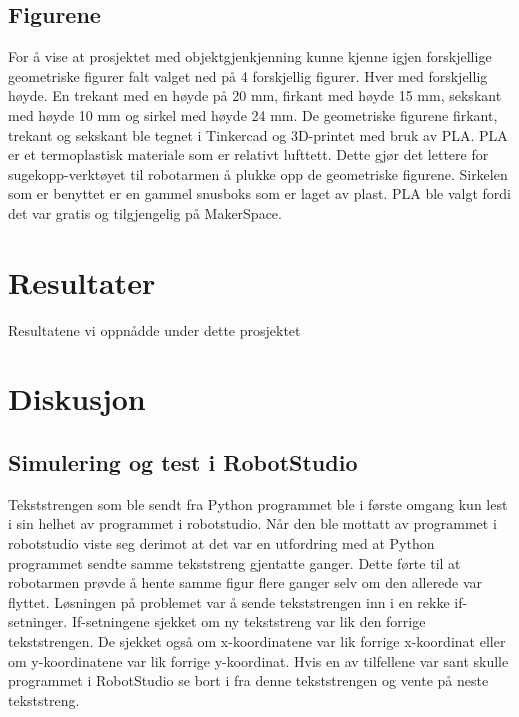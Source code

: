 \documentclass[conference]{IEEEtran}
\begin{document}
    \subsection{Figurene}
        For å vise at prosjektet med objektgjenkjenning kunne kjenne igjen forskjellige geometriske figurer falt valget ned på 4 forskjellig figurer. 
        Hver med forskjellig høyde. En trekant med en høyde på 20 mm, firkant med høyde 15 mm, sekskant med høyde 10 mm og sirkel med høyde 24 mm. 
        De geometriske figurene firkant, trekant og sekskant ble tegnet i Tinkercad \cite{metode:tinkercad} og 3D-printet med bruk av PLA. PLA er et termoplastisk materiale 
        som er relativt lufttett. Dette gjør det lettere for sugekopp-verktøyet til robotarmen å plukke opp de geometriske figurene. Sirkelen som er 
        benyttet er en gammel snusboks som er laget av plast. PLA ble valgt fordi det var gratis og tilgjengelig på MakerSpace.

    

    
\section{Resultater}
    Resultatene vi oppnådde under dette prosjektet
    
\section{Diskusjon}
    \subsection{Simulering og test i RobotStudio}
        Tekststrengen som ble sendt fra Python programmet ble i første omgang kun lest i sin helhet av programmet i robotstudio. Når den ble mottatt 
        av programmet i robotstudio viste seg derimot at det var en utfordring med at Python programmet sendte samme tekststreng gjentatte ganger. 
        Dette førte til at robotarmen prøvde å hente samme figur flere ganger selv om den allerede var flyttet. Løsningen på problemet var å sende 
        tekststrengen inn i en rekke if-setninger. If-setningene sjekket om ny tekststreng var lik den forrige tekststrengen. De sjekket også om 
        x-koordinatene var lik forrige x-koordinat eller om y-koordinatene var lik forrige y-koordinat. Hvis en av tilfellene var sant skulle 
        programmet i RobotStudio se bort i fra denne tekststrengen og vente på neste tekststreng.
\end{document}
